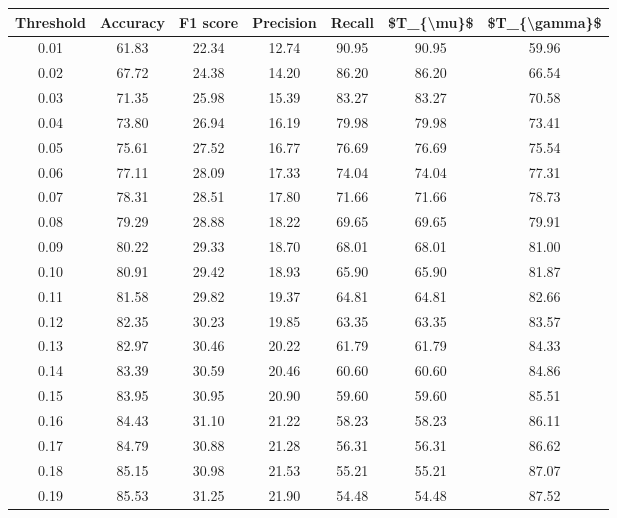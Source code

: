\begin{tabular}{|c|c|c|c|c|c|c|}
\hline
 Threshold &  Accuracy &  F1 score &  Precision &  Recall &  \$T\_\{\textbackslash mu\}\$ &  \$T\_\{\textbackslash gamma\}\$ \\
\hline
      0.01 &     61.83 &     22.34 &      12.74 &   90.95 &      90.95 &         59.96 \\
      0.02 &     67.72 &     24.38 &      14.20 &   86.20 &      86.20 &         66.54 \\
      0.03 &     71.35 &     25.98 &      15.39 &   83.27 &      83.27 &         70.58 \\
      0.04 &     73.80 &     26.94 &      16.19 &   79.98 &      79.98 &         73.41 \\
      0.05 &     75.61 &     27.52 &      16.77 &   76.69 &      76.69 &         75.54 \\
      0.06 &     77.11 &     28.09 &      17.33 &   74.04 &      74.04 &         77.31 \\
      0.07 &     78.31 &     28.51 &      17.80 &   71.66 &      71.66 &         78.73 \\
      0.08 &     79.29 &     28.88 &      18.22 &   69.65 &      69.65 &         79.91 \\
      0.09 &     80.22 &     29.33 &      18.70 &   68.01 &      68.01 &         81.00 \\
      0.10 &     80.91 &     29.42 &      18.93 &   65.90 &      65.90 &         81.87 \\
      0.11 &     81.58 &     29.82 &      19.37 &   64.81 &      64.81 &         82.66 \\
      0.12 &     82.35 &     30.23 &      19.85 &   63.35 &      63.35 &         83.57 \\
      0.13 &     82.97 &     30.46 &      20.22 &   61.79 &      61.79 &         84.33 \\
      0.14 &     83.39 &     30.59 &      20.46 &   60.60 &      60.60 &         84.86 \\
      0.15 &     83.95 &     30.95 &      20.90 &   59.60 &      59.60 &         85.51 \\
      0.16 &     84.43 &     31.10 &      21.22 &   58.23 &      58.23 &         86.11 \\
      0.17 &     84.79 &     30.88 &      21.28 &   56.31 &      56.31 &         86.62 \\
      0.18 &     85.15 &     30.98 &      21.53 &   55.21 &      55.21 &         87.07 \\
      0.19 &     85.53 &     31.25 &      21.90 &   54.48 &      54.48 &         87.52 \\

\end{tabular}
